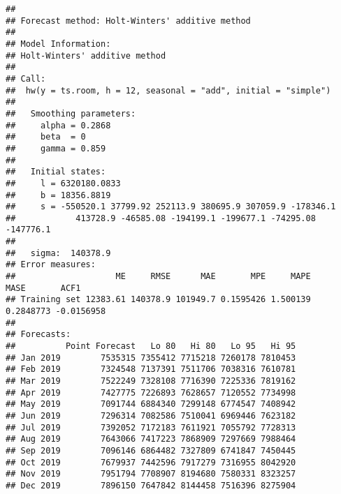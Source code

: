 \documentclass[]{article}
\newenvironment{Shaded}{\begin{snugshade}}{\end{snugshade}}
\newcommand{\CommentTok}[1]{\textcolor[rgb]{0.56,0.35,0.01}{\textit{#1}}}
\newcommand{\DataTypeTok}[1]{\textcolor[rgb]{0.13,0.29,0.53}{#1}}
\newcommand{\DecValTok}[1]{\textcolor[rgb]{0.00,0.00,0.81}{#1}}
\newcommand{\KeywordTok}[1]{\textcolor[rgb]{0.13,0.29,0.53}{\textbf{#1}}}
\newcommand{\NormalTok}[1]{#1}
\newcommand{\OperatorTok}[1]{\textcolor[rgb]{0.81,0.36,0.00}{\textbf{#1}}}
\newcommand{\StringTok}[1]{\textcolor[rgb]{0.31,0.60,0.02}{#1}}
\begin{document}
\begin{verbatim}
## 
## Forecast method: Holt-Winters' additive method
## 
## Model Information:
## Holt-Winters' additive method 
## 
## Call:
##  hw(y = ts.room, h = 12, seasonal = "add", initial = "simple") 
## 
##   Smoothing parameters:
##     alpha = 0.2868 
##     beta  = 0 
##     gamma = 0.859 
## 
##   Initial states:
##     l = 6320180.0833 
##     b = 18356.8819 
##     s = -550520.1 37799.92 252113.9 380695.9 307059.9 -178346.1
##            413728.9 -46585.08 -194199.1 -199677.1 -74295.08 -147776.1
## 
##   sigma:  140378.9
## Error measures:
##                    ME     RMSE      MAE       MPE     MAPE      MASE       ACF1
## Training set 12383.61 140378.9 101949.7 0.1595426 1.500139 0.2848773 -0.0156958
## 
## Forecasts:
##          Point Forecast   Lo 80   Hi 80   Lo 95   Hi 95
## Jan 2019        7535315 7355412 7715218 7260178 7810453
## Feb 2019        7324548 7137391 7511706 7038316 7610781
## Mar 2019        7522249 7328108 7716390 7225336 7819162
## Apr 2019        7427775 7226893 7628657 7120552 7734998
## May 2019        7091744 6884340 7299148 6774547 7408942
## Jun 2019        7296314 7082586 7510041 6969446 7623182
## Jul 2019        7392052 7172183 7611921 7055792 7728313
## Aug 2019        7643066 7417223 7868909 7297669 7988464
## Sep 2019        7096146 6864482 7327809 6741847 7450445
## Oct 2019        7679937 7442596 7917279 7316955 8042920
## Nov 2019        7951794 7708907 8194680 7580331 8323257
## Dec 2019        7896150 7647842 8144458 7516396 8275904
\end{verbatim}

\begin{Shaded}
\end{Shaded}
\end{document}
